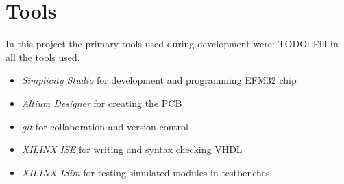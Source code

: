 \section{Tools}
In this project the primary tools used during development were:
TODO: Fill in all the tools used.

\begin{itemize}
    \item   \textit{Simplicity Studio} for development and programming EFM32 chip
    \item   \textit{Altium Designer} for creating the PCB
    \item   \textit{git} for collaboration and version control
    \item   \textit{XILINX ISE} for writing and syntax checking VHDL
    \item   \textit{XILINX ISim} for testing simulated modules in testbenches
\end{itemize}
